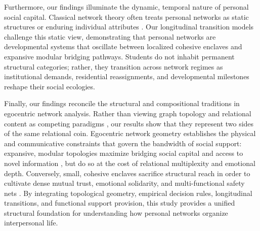 \documentclass[12pt]{article}
\begin{document}
Furthermore, our findings illuminate the dynamic, temporal nature of personal social capital. Classical network theory often treats personal networks as static structures or enduring individual attributes \citep{fischer1982dwell, mccarty2002structure}. Our longitudinal transition models challenge this static view, demonstrating that personal networks are developmental systems that oscillate between localized cohesive enclaves and expansive modular bridging pathways. Students do not inhabit permanent structural categories; rather, they transition across network regimes as institutional demands, residential reassignments, and developmental milestones reshape their social ecologies.

Finally, our findings reconcile the structural and compositional traditions in egocentric network analysis. Rather than viewing graph topology and relational content as competing paradigms \citep{antonucci2013convoy, mccarty2002structure, offer2018does}, our results show that they represent two sides of the same relational coin. Egocentric network geometry establishes the physical and communicative constraints that govern the bandwidth of social support: expansive, modular topologies maximize bridging social capital and access to novel information \citep{burt1992structural, granovetter1973strength}, but do so at the cost of relational multiplexity and emotional depth. Conversely, small, cohesive enclaves sacrifice structural reach in order to cultivate dense mutual trust, emotional solidarity, and multi-functional safety nets \citep{coleman1988social, lin2001social}. By integrating topological geometry, empirical decision rules, longitudinal transitions, and functional support provision, this study provides a unified structural foundation for understanding how personal networks organize interpersonal life.



\end{document}
